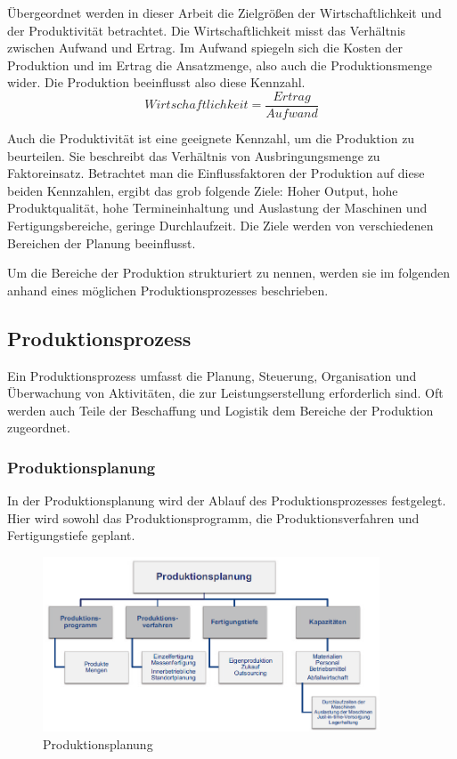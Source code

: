 \documentclass[a4paper,12pt, german]{report}
\begin{document}
Übergeordnet werden in dieser Arbeit die Zielgrößen der Wirtschaftlichkeit und der Produktivität betrachtet. Die Wirtschaftlichkeit misst das Verhältnis zwischen Aufwand und Ertrag. Im Aufwand spiegeln sich die Kosten der Produktion und im Ertrag die Ansatzmenge, also auch die Produktionsmenge wider. Die Produktion beeinflusst also diese Kennzahl.
\begin{equation}
  Wirtschaftlichkeit =\frac{Ertrag}{Aufwand}
\end{equation}

Auch die Produktivität ist eine geeignete Kennzahl, um die Produktion zu beurteilen. Sie beschreibt das Verhältnis von Ausbringungsmenge zu Faktoreinsatz. Betrachtet man die Einflussfaktoren der Produktion auf diese beiden Kennzahlen, ergibt das grob folgende Ziele: Hoher Output, hohe Produktqualität, hohe Termineinhaltung und Auslastung der Maschinen und Fertigungsbereiche, geringe Durchlaufzeit. Die Ziele werden von verschiedenen Bereichen der Planung beeinflusst.

Um die Bereiche der Produktion strukturiert zu nennen, werden sie im folgenden anhand eines möglichen Produktionsprozesses beschrieben. 

\subsection{Produktionsprozess}

Ein Produktionsprozess umfasst die Planung, Steuerung, Organisation und Überwachung von Aktivitäten, die zur Leistungserstellung erforderlich sind. 
Oft werden auch Teile der Beschaffung und Logistik dem Bereiche der Produktion zugeordnet. 

\subsubsection{Produktionsplanung}

In der Produktionsplanung wird der Ablauf des Produktionsprozesses festgelegt. Hier wird sowohl das Produktionsprogramm, die Produktionsverfahren und Fertigungstiefe geplant.

\begin{figure}[H]
  \center
 \includegraphics[width=10cm]{images/Produktionsplanung.png}
  \caption[Produktionsplanung]{Produktionsplanung \cite{07}}
\end{figure}
\end{document}
